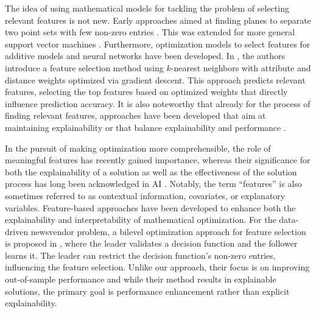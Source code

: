 \documentclass[11pt, a4paper]{article}
\begin{document}
The idea of using mathematical models for tackling the problem of selecting relevant features is not new. Early approaches aimed at finding planes to separate two point sets with few non-zero entries \citep{bradley1998feature}. This was extended for more general support vector machines \citep{NGUYEN2010584,LABBE2019}. Furthermore, optimization models to select features for additive models \citep{navarro2025feature} and neural networks \citep{zhao2023model} have been developed. In \citep{bugata2019weighted}, the authors introduce a  feature selection method using $k$-nearest neighbors with attribute and distance weights optimized via gradient descent. This approach predicts relevant features, selecting the top features based on optimized weights that directly influence prediction accuracy. It is also noteworthy that already for the process of finding relevant features, approaches have been developed that aim at maintaining explainability \citep{zacharias2022designing} or that balance explainability and performance \citep{lazebnik2024algorithm}.



In the pursuit of making optimization more comprehensible, the role of meaningful features has recently gained importance, whereas their significance for both the explainability of a solution as well as the effectiveness of the solution process has long been acknowledged in AI \citep{janzing2020feature,johannesson2023explanatory}.  Notably, the term ``features'' is also sometimes referred to as contextual information, covariates, or explanatory variables. Feature-based approaches have been developed to enhance both the explainability \citep{aigner2024framework} and interpretability \citep{goerigk2024feature} of mathematical optimization.
For the data-driven newsvendor problem, a bilevel optimization approach for feature selection is proposed in \cite{SERRANO2024703}, where the leader validates a decision function and the follower learns it. The leader can restrict the decision function’s non-zero entries, influencing the feature selection. Unlike our approach, their focus is on improving out-of-sample performance and while their method results in explainable solutions, the primary goal is performance enhancement rather than explicit explainability.
\end{document}
